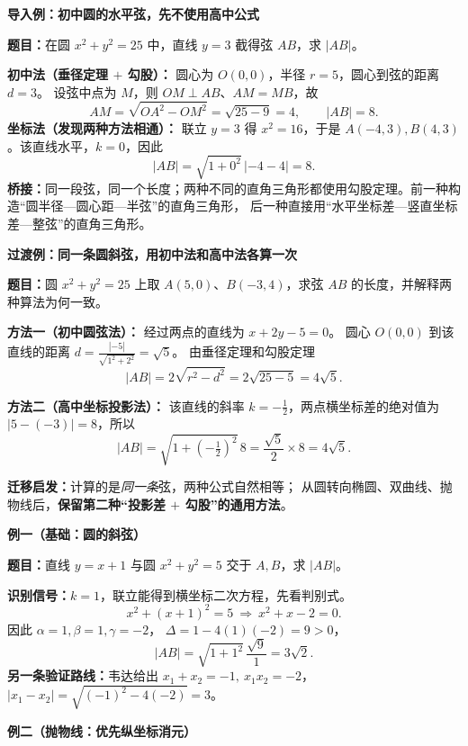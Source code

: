 \begin{examplebox}
\textbf{\textcolor{CExample}{导入例：初中圆的水平弦，先不使用高中公式}}

\textbf{题目：}在圆 $x^2+y^2=25$ 中，直线 $y=3$ 截得弦 $AB$，求 $|AB|$。

\textbf{初中法（垂径定理 $+$ 勾股）：}
圆心为 $O(0,0)$，半径 $r=5$，圆心到弦的距离 $d=3$。
设弦中点为 $M$，则 $OM\perp AB$、$AM=MB$，故
\[
 AM=\sqrt{OA^2-OM^2}=\sqrt{25-9}=4,
 \qquad\boxed{|AB|=8.}
\]
\textbf{坐标法（发现两种方法相通）：}
联立 $y=3$ 得 $x^2=16$，于是
$A(-4,3),B(4,3)$。该直线水平，$k=0$，因此
\[
 |AB|=\sqrt{1+0^2}\,|{-4}-4|=8.
\]
\textbf{桥接：}同一段弦，同一个长度；两种不同的直角三角形都使用勾股定理。前一种构造“圆半径—圆心距—半弦”的直角三角形，
后一种直接用“水平坐标差—竖直坐标差—整弦”的直角三角形。

\medskip
\textbf{\textcolor{CExample}{过渡例：同一条圆斜弦，用初中法和高中法各算一次}}

\textbf{题目：}圆 $x^2+y^2=25$ 上取
$A(5,0)$、$B(-3,4)$，求弦 $AB$ 的长度，并解释两种算法为何一致。



\textbf{方法一（初中圆弦法）：}
经过两点的直线为 $x+2y-5=0$。
圆心 $O(0,0)$ 到该直线的距离
$\displaystyle d=\frac{|{-5}|}{\sqrt{1^2+2^2}}=\sqrt5$。
由垂径定理和勾股定理
\[
 |AB|=2\sqrt{r^2-d^2}
 =2\sqrt{25-5}=\boxed{4\sqrt5}.
\]

\textbf{方法二（高中坐标投影法）：}
该直线的斜率 $k=-\frac12$，两点横坐标差的绝对值为
$|5-(-3)|=8$，所以
\[
 |AB|=\sqrt{1+\left(-\tfrac12\right)^2}\,8
 =\frac{\sqrt5}{2}\times8=\boxed{4\sqrt5}.
\]

\textbf{迁移启发：}计算的是\emph{同一条}弦，两种公式自然相等；
从圆转向椭圆、双曲线、抛物线后，\textbf{保留第二种“投影差 $+$ 勾股”的通用方法}。

\medskip
\textbf{\textcolor{CExample}{例一（基础：圆的斜弦）}}

\textbf{题目：}直线 $y=x+1$ 与圆 $x^2+y^2=5$ 交于 $A,B$，求 $|AB|$。

\textbf{识别信号：}$k=1$，联立能得到横坐标二次方程，先看判别式。
\[
 x^2+(x+1)^2=5\ \Longrightarrow\  x^2+x-2=0.
\]
因此 $\alpha=1,\beta=1,\gamma=-2$，
$\Delta=1-4(1)(-2)=9>0$，
\[
 \boxed{|AB|=\sqrt{1+1^2}\,\frac{\sqrt9}{1}=3\sqrt2.}
\]
\textbf{另一条验证路线：}韦达给出
$x_1+x_2=-1,\ x_1x_2=-2$，
$|x_1-x_2|=\sqrt{(-1)^2-4(-2)}=3$。

\medskip
\textbf{\textcolor{CExample}{例二（抛物线：优先纵坐标消元）}}


\end{examplebox}
